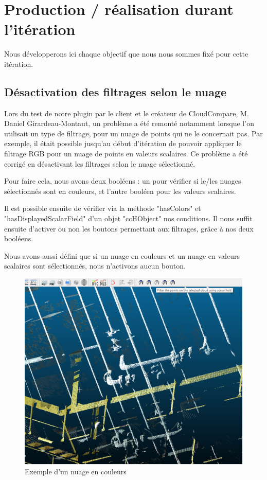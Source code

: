 \documentclass[12pt,titlepage,french]{article}
\begin{document}
\section{Production / réalisation durant l'itération}

Nous développerons ici chaque objectif que nous nous sommes fixé pour cette itération.


\subsection{Désactivation des filtrages selon le nuage}

Lors du test de notre plugin par le client et le créateur de CloudCompare, M. Daniel Girardeau-Montaut, un problème a été remonté notamment lorsque l'on utilisait un type de filtrage, pour un nuage de points qui ne le concernait pas. Par exemple, il était possible jusqu'au début d'itération de pouvoir appliquer le filtrage RGB pour un nuage de points en valeurs scalaires. Ce problème a été corrigé en désactivant les filtrages selon le nuage sélectionné. \newline

Pour faire cela, nous avons deux booléens : un pour vérifier si le/les nuages sélectionnés sont en couleurs, et l'autre booléen pour les valeurs scalaires. \newline

Il est possible ensuite de vérifier via la méthode "hasColors" et "hasDisplayedScalarField" d'un objet "ccHObject" nos conditions. Il nous suffit ensuite d'activer ou non les boutons permettant aux filtrages, grâce à nos deux booléens. \newline

Nous avons aussi défini que si un nuage en couleurs et un nuage en valeurs scalaires sont sélectionnés, nous n'activons aucun bouton.

\begin{figure}[H]
 \caption{\label{} Exemple d'un nuage en couleurs}
 \begin{center}
 \includegraphics[width=1\textwidth]{./img/color_cloud.PNG}
  \end{center}
\end{figure}
\end{document}
